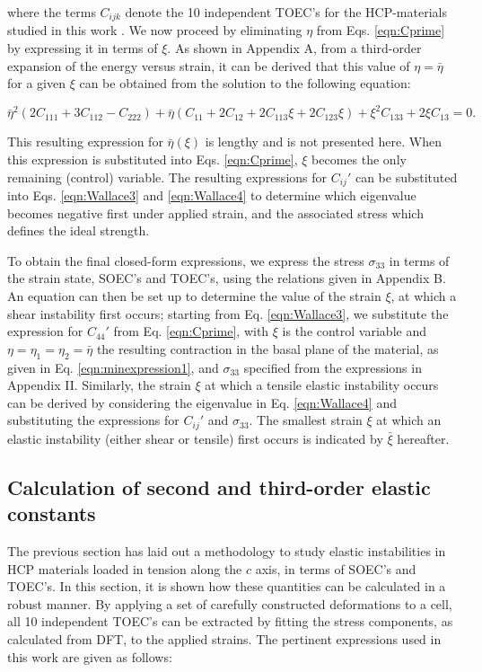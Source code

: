 \documentclass[showpacs,aps,floatfix,prb,reprint,superscriptaddress]{revtex4-1}
\begin{document}
where the terms $C_{ijk}$ denote the 10 independent TOEC's for the HCP-materials studied in this work \cite{hearmon1953third,rose1968higher,fumi1951third,fumi1952third}. We now proceed by eliminating $\eta$ from Eqs. \ref{eqn:Cprime} by expressing it in terms of $\xi$.  As shown in Appendix A, from a third-order expansion of the energy versus strain, it can be derived that this value of $\eta=\bar{\eta}$ for a given $\xi$ can be obtained from the solution to the following equation:
\begin{widetext}
\begin{equation}
\label{eqn:minexpression1}
\bar{\eta}^{2} \left(2C_{111} + 3C_{112} - C_{222} \right) + \bar{\eta} \left(C_{11} + 2C_{12} + 2C_{113} \xi + 2C_{123} \xi \right) + \xi^{2} C_{133} + 2\xi C_{13} = 0.
\end{equation}
\end{widetext} 
This resulting expression for $\bar{\eta}(\xi)$ is lengthy and is not presented here.  When this expression is substituted into Eqs. \ref{eqn:Cprime}, $\xi$ becomes the only remaining (control) variable. The resulting expressions for $C_{ij}'$ can be substituted into Eqs. \ref{eqn:Wallace3} and \ref{eqn:Wallace4} to determine which eigenvalue becomes negative first under applied strain, and the associated stress which defines the ideal strength.

To obtain the final closed-form expressions, we express the stress $\sigma_{33}$ in terms of the strain state, SOEC's and TOEC's, using the relations given in Appendix B.  An equation can then be set up to determine the value of the strain $\xi$, at which a shear instability first occurs; starting from Eq. \ref{eqn:Wallace3}, we substitute the expression for $C_{44}'$ from Eq. \ref{eqn:Cprime}, with $\xi$ is the control variable and $\eta = \eta_{1} = \eta_{2} = \bar{\eta}$ the resulting contraction in the basal plane of the material, as given in Eq. \ref{eqn:minexpression1}, and $\sigma_{33}$ specified from the expressions in Appendix II.  Similarly, the strain $\xi$ at which a tensile elastic instability occurs can be derived by considering the eigenvalue in Eq. \ref{eqn:Wallace4} and substituting the expressions for $C_{ij}'$ and $\sigma_{33}$. The smallest strain $\xi$ at which an elastic instability (either shear or tensile) first occurs is indicated by $\bar{\xi}$ hereafter.

\subsection{Calculation of second and third-order elastic constants}
The previous section has laid out a methodology to study elastic instabilities in HCP materials loaded in tension along the $c$ axis, in terms of SOEC's and TOEC's. In this section, it is shown how these quantities can be calculated in a robust manner.  By applying a set of carefully constructed deformations to a cell, all 10 independent TOEC's can be extracted by fitting the stress components, as calculated from DFT, to the applied strains. The pertinent expressions used in this work are given as follows:
\onecolumngrid
\end{document}
